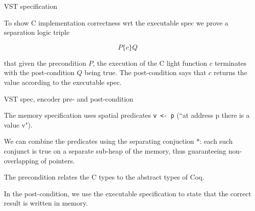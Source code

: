 \documentclass[10pt,usenames,dvipsnames,landscape]{beamer}
\begin{document}
\begin{frame}{VST specification}

To show C implementation correctness wrt the executable spec we prove a separation logic triple 

$$P \{c\} Q$$

that given the precondition $P$, the execution of the C light function $c$ terminates with the post-condition $Q$ being true. The post-condition says that $c$ returns the value according to the executable spec. 

    
\end{frame}{}

\begin{frame}[fragile]{VST spec, encoder pre- and post-condition}

The memory specification uses spatial predicates \lstinline[language=Coq]{v <- p} (``at address p there is a value v"). %

We can combine the predicates using the separating conjuction $*$: each such conjunct is true on a separate sub-heap of the memory, thus guaranteeing non-overlapping of pointers.

The precondition relates the C types to the abstract types of Coq. 

In the post-condition, we use the executable specification to state that the correct result is written in memory. 

\end{frame}
\end{document}
